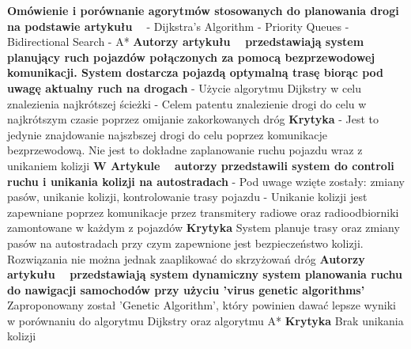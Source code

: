 \newline
\newline
\textbf{Omówienie i porównanie agorytmów stosowanych do planowania drogi na podstawie artykułu ~\cite{delling2009engineering}}
  \newline
  - Dijkstra's Algorithm
  \newline
  - Priority Queues
  \newline
  - Bidirectional Search
  \newline
  - A*
  \newline
\newline
\newline
\textbf{Autorzy artykułu ~\cite{gazis1997optimal} przedstawiają system planujący ruch pojazdów połączonych za pomocą bezprzewodowej komunikacji. System dostarcza pojazdą optymalną trasę biorąc pod uwagę aktualny ruch na drogach}
\newline
- Użycie algorytmu Dijkstry w celu znalezienia najkrótszej ścieżki
\newline
- Celem patentu znalezienie drogi do celu w najkrótszym czasie poprzez omijanie zakorkowanych dróg
\newline
\newline
\textbf{Krytyka}
\newline
- Jest to jedynie znajdowanie najszbszej drogi do celu poprzez komunikacje bezprzewodową. Nie jest to dokładne zaplanowanie ruchu pojazdu wraz z unikaniem kolizji
\newline
\newline
\textbf{W Artykule ~\cite{broxmeyer1994vehicle} autorzy przedstawili system do controli ruchu i unikania kolizji na autostradach}
\newline
- Pod uwage wzięte zostały: zmiany pasów, unikanie kolizji, kontrolowanie trasy pojazdu
\newline
- Unikanie kolizji jest zapewniane poprzez komunikacje przez transmitery radiowe oraz radioodbiorniki zamontowane w każdym z pojazdów
\newline
\newline
\textbf{Krytyka}
\newline
System planuje trasy oraz zmiany pasów na autostradach przy czym zapewnione jest bezpieczeństwo kolizji. Rozwiązania nie można jednak zaaplikować do skrzyżowań dróg
\newline
\newline
\textbf{Autorzy artykułu ~\cite{kanoh2007dynamic} przedstawiają system dynamiczny system planowania ruchu do nawigacji samochodów przy użyciu 'virus genetic algorithms'}
\newline
Zaproponowany został 'Genetic Algorithm', który powinien dawać lepsze wyniki w porównaniu do algorytmu Dijkstry oraz algorytmu A*
\newline
\newline
\textbf{Krytyka}
\newline
Brak unikania kolizji

